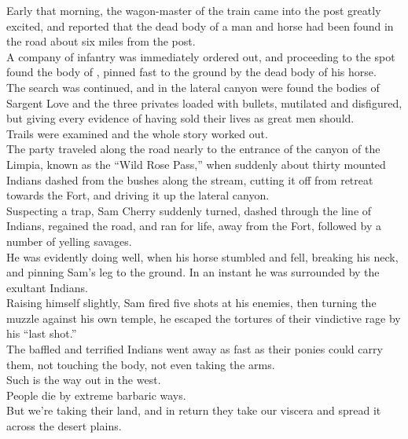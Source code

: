 Early that morning, the wagon-master of the train came into the post greatly excited, and reported that the dead body of a man and horse had been found in the road about six miles from the post. \\

A company of infantry was immediately ordered out, and proceeding to the spot found the body of , pinned fast to the ground by the dead body of his horse. \\

The search was continued, and in the lateral canyon were found the bodies of Sargent Love and the three privates loaded with bullets, mutilated and disfigured, but giving every evidence of having sold their lives as great men should. \\

Trails were examined and the whole story worked out. \\

The party traveled along the road nearly to the entrance of the canyon of the Limpia, known as the ``Wild Rose Pass,'' when suddenly about thirty mounted Indians dashed from the bushes along the stream, cutting it off from retreat towards the Fort, and driving it up the lateral canyon. \\

Suspecting a trap, Sam Cherry suddenly turned, dashed through the line of Indians, regained the road, and ran for life, away from the Fort, followed by a number of yelling savages. \\
He was evidently doing well, when his horse stumbled and fell, breaking his neck, and pinning Sam's leg to the ground. In an instant he was surrounded by the exultant Indians. \\

Raising himself slightly, Sam fired five shots at his enemies, then turning the muzzle against his own temple, he escaped the tortures of their vindictive rage by his ``last shot.'' \\
The baffled and terrified Indians went away as fast as their ponies could carry them, not touching the body, not even taking the arms. \\

Such is the way out in the west. \\
People die by extreme barbaric ways. \\
But we're taking their land, and in return they take our viscera and spread it across the desert plains. \\

